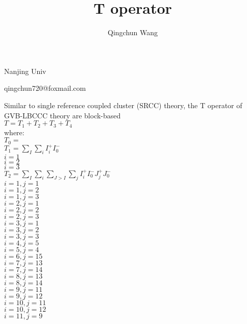 \documentclass[14pt]{article}
\begin{document}
    \title{ T operator }
    \author{Qingchun Wang}
    \maketitle
    \centerline{Nanjing Univ}
    \centerline{qingchun720@foxmail.com}
    
    \linespread{2.0}\selectfont
    \thispagestyle{empty}
    
    \newpage
    \setlength{\parindent}{0pt}
    \setcounter{page}{1}
    
    Similar to single reference coupled cluster (SRCC) theory, the T operator of GVB-LBCCC theory are block-based \\ 
    $T = T_1+T_2+T_3+T_4 $ \\ 
    where: \\ 
    $T_0 = {} $ \\ 
    $ $ \\ 
    $T_1 = \displaystyle\sum_{I}\displaystyle\sum_i{I_i^+I_0^-} $ \\ 
    $i=1 $ \\ 
    $i=2 $ \\ 
    $i=3 $ \\ 
    $T_2 = \displaystyle\sum_{I}\displaystyle\sum_i\displaystyle\sum_{J>I}\displaystyle\sum_j{I_i^+I_0^-J_j^+J_0^-} $ \\ 
    $i=1,j=1 $ \\ 
    $i=1,j=2 $ \\ 
    $i=1,j=3 $ \\ 
    $i=2,j=1 $ \\ 
    $i=2,j=2 $ \\ 
    $i=2,j=3 $ \\ 
    $i=3,j=1 $ \\ 
    $i=3,j=2 $ \\ 
    $i=3,j=3 $ \\ 
    $i=4,j=5 $ \\ 
    $i=5,j=4 $ \\ 
    $i=6,j=15 $ \\ 
    $i=7,j=13 $ \\ 
    $i=7,j=14 $ \\ 
    $i=8,j=13 $ \\ 
    $i=8,j=14 $ \\ 
    $i=9,j=11 $ \\ 
    $i=9,j=12 $ \\ 
    $i=10,j=11 $ \\ 
    $i=10,j=12 $ \\ 
    $i=11,j=9 $ \\ 
\end{document}
